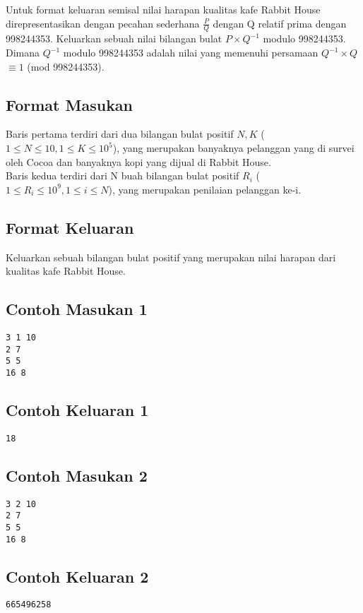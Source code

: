 \documentclass{article}
\begin{document}
Untuk format keluaran semisal nilai harapan kualitas kafe Rabbit House direpresentasikan dengan pecahan sederhana $\frac{P}{Q}$ dengan Q relatif prima dengan 998244353. Keluarkan sebuah nilai bilangan bulat $P \times Q^{-1}$ modulo 998244353. Dimana $Q^{-1}$ modulo 998244353 adalah nilai yang memenuhi persamaan $Q^{-1} \times Q$ $\equiv 1$ (mod 998244353). 

\subsection*{Format Masukan}

Baris pertama terdiri dari dua bilangan bulat positif $N, K$ ($1 \leq N \leq 10, 1 \leq K \leq 10^{5}$), yang merupakan banyaknya pelanggan yang di survei oleh Cocoa dan banyaknya kopi yang dijual di Rabbit House.\\
Baris kedua terdiri dari N buah bilangan bulat positif $R_i$ ($1 \leq R_i \leq 10^9, 1 \leq i \leq N $), yang merupakan penilaian pelanggan ke-i.

\subsection*{Format Keluaran}

Keluarkan sebuah bilangan bulat positif yang merupakan nilai harapan dari kualitas kafe Rabbit House.

\begin{multicols}{2}
\subsection*{Contoh Masukan 1}
\begin{lstlisting}
3 1 10
2 7
5 5
16 8
\end{lstlisting}
\columnbreak
\subsection*{Contoh Keluaran 1}
\begin{lstlisting}
18
\end{lstlisting}
\vfill
\null
\end{multicols}

\begin{multicols}{2}
\subsection*{Contoh Masukan 2}
\begin{lstlisting}
3 2 10
2 7
5 5
16 8
\end{lstlisting}
\columnbreak
\subsection*{Contoh Keluaran 2}
\begin{lstlisting}
665496258
\end{lstlisting}
\vfill
\null
\end{multicols}
\end{document}
